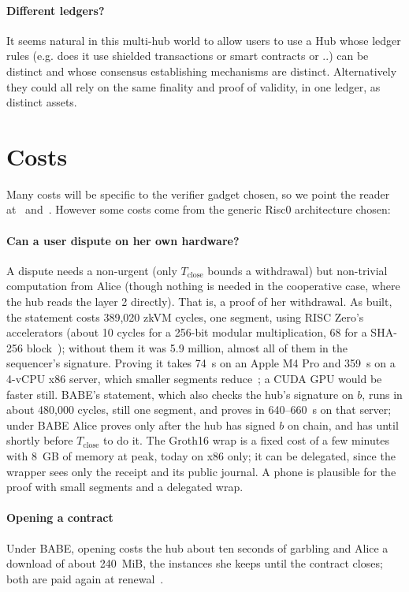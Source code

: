 \documentclass[11pt]{article}
\newcommand{\Tc}{T_{\mathrm{close}}}
\begin{document}
\paragraph{Different ledgers?} It seems natural in this multi-hub world to allow users to use a Hub whose ledger rules (e.g. does it use shielded transactions or smart contracts or ..) can be distinct and whose consensus establishing mechanisms are distinct. Alternatively they could all rely on the same finality and proof of validity, in one ledger, as distinct assets.

\section{Costs}
\label{sec:costs}

Many costs will be specific to the verifier gadget chosen, so we point the reader at~\cite{lichenbitvmx} and~\cite{lichenbabe}. However some costs come from the generic Risc0 architecture chosen:

\paragraph{Can a user dispute on her own hardware?} A dispute needs
a non-urgent (only $\Tc$ bounds
a withdrawal) but non-trivial computation from Alice (though nothing is needed in the cooperative case, where the hub
reads the layer 2 directly). That is, a proof of her withdrawal. As built,
the statement costs 389,020 zkVM cycles, one segment, using RISC Zero's
accelerators (about 10 cycles for a 256-bit modular multiplication, 68
for a SHA-256 block~\cite{risc0accel}); without them it was 5.9
million, almost all of them in the sequencer's signature. Proving it
takes 74~s on an Apple M4 Pro and 359~s on a
4-vCPU x86 server, which smaller
segments reduce~\cite{risc0data}; a CUDA GPU would be faster still.
BABE's statement, which also checks the hub's signature on $b$, runs in
about 480,000 cycles, still one segment, and proves in 640--660~s on that
server; under BABE Alice proves only after the hub has signed $b$ on
chain, and has until shortly before $\Tc$ to do it. The Groth16 wrap is a fixed cost of a few minutes with 8~GB of memory at peak, today on x86
only; it can be delegated, since the wrapper sees only the receipt and
its public journal. A phone is plausible for the proof with small segments and a delegated wrap.

\paragraph{Opening a contract} Under BABE, opening costs the hub about ten seconds of garbling and Alice a download of about 240~MiB, the instances she keeps until the contract closes; both are paid again at renewal~\cite[\S 8]{lichenbabe}.
\end{document}
